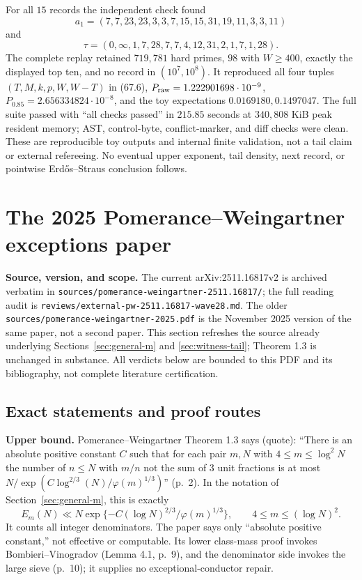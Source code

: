\documentclass[10pt,reqno]{amsart}
\theoremstyle{definition}
\newcommand{\1}{\mathbf 1}
\begin{document}
For all $15$ records the independent check found
\[
 a_1=(7,7,23,23,3,3,7,15,15,31,19,11,3,3,11)
\]
and
\[
 \tau=(0,\infty,1,7,28,7,7,4,12,31,2,1,7,1,28).
\]
The complete replay retained $719{,}781$ hard primes, $98$ with $W\geq400$,
exactly the displayed top ten, and no record in $(10^7,10^8)$.  It reproduced
all four tuples
$(T,M,k,p,W,W-T)$ in (67.6),
$P_{\rm raw}=1.222901698\cdot10^{-9}$,
$P_{0.85}=2.656334824\cdot10^{-8}$, and the toy expectations
$0.0169180,0.1497047$.  The full suite passed with ``all checks passed'' in
$215.85$ seconds at $340{,}808$ KiB peak resident memory; AST, control-byte,
conflict-marker, and diff checks were clean.  These are reproducible toy
outputs and internal finite validation, not a tail claim or external
refereeing.  No eventual upper exponent, tail density, next record, or
pointwise Erd\H{o}s--Straus conclusion follows.

\section{The 2025 Pomerance--Weingartner exceptions paper}
\label{sec:PW-v2-audit}
\medskip\noindent\textbf{Source, version, and scope.}
The current arXiv:2511.16817v2 is archived verbatim in
\texttt{sources/pomerance-weingartner-2511.16817/}; the full reading audit is
\texttt{reviews/external-pw-2511.16817-wave28.md}.  The older
\texttt{sources/pomerance-weingartner-2025.pdf} is the November 2025 version
of the same paper, not a second paper.  This section refreshes the source
already underlying Sections~\ref{sec:general-m} and
\ref{sec:witness-tail}; Theorem 1.3 is unchanged in substance.  All verdicts
below are bounded to this PDF and its bibliography, not complete literature
certification.

\subsection{Exact statements and proof routes}
\medskip\noindent\textbf{Upper bound.}
Pomerance--Weingartner Theorem 1.3 says (quote): ``There is an absolute
positive constant $C$ such that for each pair $m,N$ with
$4\leq m\leq\log^2N$ the number of $n\leq N$ with $m/n$ not the sum of
$3$ unit fractions is at most
$N/\exp(C\log^{2/3}(N)/\varphi(m)^{1/3})$'' (p.~2).  In the notation of
Section~\ref{sec:general-m}, this is exactly
\begin{equation}\tag{68.1}
 E_m(N)\ll N\exp\{-C(\log N)^{2/3}/\varphi(m)^{1/3}\},
 \qquad4\leq m\leq(\log N)^2.
\end{equation}
It counts all integer denominators.  The paper says only ``absolute positive
constant,'' not effective or computable.  Its lower class-mass proof invokes
Bombieri--Vinogradov (Lemma 4.1, p.~9), and the denominator side invokes the
large sieve (p.~10); it supplies no exceptional-conductor repair.
\end{document}
